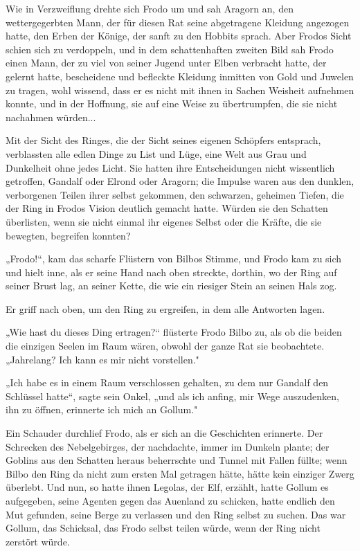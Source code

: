{Wie in Verzweiflung drehte sich Frodo um und sah Aragorn an, den wettergegerbten Mann, der für diesen Rat seine abgetragene Kleidung angezogen hatte, den Erben der Könige, der sanft zu den Hobbits sprach. Aber Frodos Sicht schien sich zu verdoppeln, und in dem schattenhaften zweiten Bild sah Frodo einen Mann, der zu viel von seiner Jugend unter Elben verbracht hatte, der gelernt hatte, bescheidene und befleckte Kleidung inmitten von Gold und Juwelen zu tragen, wohl wissend, dass er es nicht mit ihnen in Sachen Weisheit aufnehmen konnte, und in der Hoffnung, sie auf eine Weise zu übertrumpfen, die sie nicht nachahmen würden...

Mit der Sicht des Ringes, die der Sicht seines eigenen Schöpfers entsprach, verblassten alle edlen Dinge zu List und Lüge, eine Welt aus Grau und Dunkelheit ohne jedes Licht. Sie hatten ihre Entscheidungen nicht wissentlich getroffen, Gandalf oder Elrond oder Aragorn; die Impulse waren aus den dunklen, verborgenen Teilen ihrer selbst gekommen, den schwarzen, geheimen Tiefen, die der Ring in Frodos Vision deutlich gemacht hatte. Würden sie den Schatten überlisten, wenn sie nicht einmal ihr eigenes Selbst oder die Kräfte, die sie bewegten, begreifen konnten?

„Frodo!“, kam das scharfe Flüstern von Bilbos Stimme, und Frodo kam zu sich und hielt inne, als er seine Hand nach oben streckte, dorthin, wo der Ring auf seiner Brust lag, an seiner Kette, die wie ein riesiger Stein an seinen Hals zog.

Er griff nach oben, um den Ring zu ergreifen, in dem alle Antworten lagen.

„Wie hast du dieses Ding ertragen?“ flüsterte Frodo Bilbo zu, als ob die beiden die einzigen Seelen im Raum wären, obwohl der ganze Rat sie beobachtete. „Jahrelang? Ich kann es mir nicht vorstellen."

„Ich habe es in einem Raum verschlossen gehalten, zu dem nur Gandalf den Schlüssel hatte“, sagte sein Onkel, „und als ich anfing, mir Wege auszudenken, ihn zu öffnen, erinnerte ich mich an Gollum."

Ein Schauder durchlief Frodo, als er sich an die Geschichten erinnerte. Der Schrecken des Nebelgebirges, der nachdachte, immer im Dunkeln plante; der Goblins aus den Schatten heraus beherrschte und Tunnel mit Fallen füllte; wenn Bilbo den Ring da nicht zum ersten Mal getragen hätte, hätte kein einziger Zwerg überlebt. Und nun, so hatte ihnen Legolas, der Elf, erzählt, hatte Gollum es aufgegeben, seine Agenten gegen das Auenland zu schicken, hatte endlich den Mut gefunden, seine Berge zu verlassen und den Ring selbst zu suchen. Das war Gollum, das Schicksal, das Frodo selbst teilen würde, wenn der Ring nicht zerstört würde.

}
